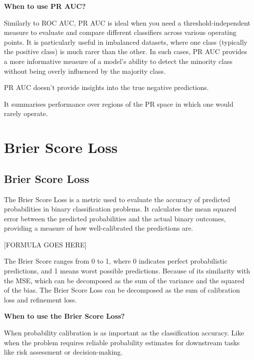\textbf{When to use PR AUC?}

Similarly to ROC AUC, PR AUC is ideal when you need a threshold-independent measure to evaluate and compare different classifiers across various operating points. 
It is particularly useful in imbalanced datasets, where one class (typically the positive class) is much rarer than the other. In such cases, PR AUC provides a more
informative measure of a model's ability to detect the minority class without being overly influenced by the majority class.

{
\item PR AUC doesn't provide insights into the true negative predictions.
\item It summarises performance over regions of the PR space in which one would rarely operate.
}


\clearpage
\thispagestyle{classificationstyle}
\section{Brier Score Loss}
\subsection{Brier Score Loss}

The Brier Score Loss is a metric used to evaluate the accuracy of predicted probabilities in binary classification problems.
It calculates the mean squared error between the predicted probabilities and the actual binary outcomes, providing a measure of how well-calibrated the predictions are.

\begin{center}
    [FORMULA GOES HERE]
\end{center}

The Brier Score ranges from 0 to 1, where 0 indicates perfect probabilistic predictions, and 1 means worst possible predictions. Because of its similarity with the MSE,
which can be decomposed as the sum of the variance and the squared of the bias. The Brier Score Loss can be decomposed as the sum of calibration loss and refinement loss.


\textbf{When to use the Brier Score Loss?}

When probability calibration is as important as the classification accuracy. Like when the problem requires reliable probability estimates for downstream tasks
like risk assessment or decision-making.

